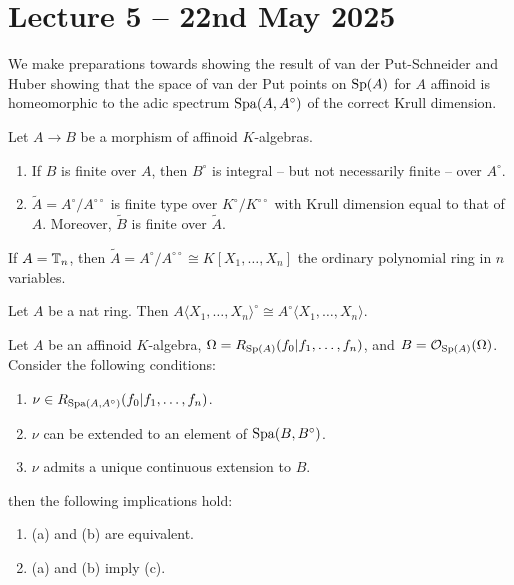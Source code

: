 \section{Lecture 5 -- 22nd May 2025}\label{sec: lecture 5}
We make preparations towards showing the result of van der Put-Schneider and Huber \cite[Thm. 4]{vdPclassification} showing that the space of van der Put points on $\mathrm{Sp}(A)$ for $A$ affinoid is homeomorphic to the adic spectrum $\mathrm{Spa}(A,A^{\circ})$ of the correct Krull dimension. 
\begin{proposition}
    Let $A\to B$ be a morphism of affinoid $K$-algebras. 
    \begin{enumerate}[label=(\roman*)]
        \item If $B$ is finite over $A$, then $B^{\circ}$ is integral -- but not necessarily finite -- over $A^{\circ}$. 
        \item $\widetilde{A}=A^{\circ}/A^{\circ\circ}$ is finite type over $K^{\circ}/K^{\circ\circ}$ with Krull dimension equal to that of $A$. Moreover, $\widetilde{B}$ is finite over $\widetilde{A}$. 
    \end{enumerate}
\end{proposition}
\begin{example}
    If $A=\mathbb{T}_{n}$, then $\widetilde{A}=A^{\circ}/A^{\circ\circ}\cong K[X_{1},\dots,X_{n}]$ the ordinary polynomial ring in $n$ variables. 
\end{example}
\begin{proposition}\label{prop: powerbounded commutes with polynomial algebra}
    Let $A$ be a nat ring. Then $A\langle X_{1},\dots,X_{n}\rangle^{\circ}\cong A^{\circ}\langle X_{1},\dots,X_{n}\rangle$. 
\end{proposition}
\begin{lemma}\label{lem: key lemma vdP points}
    Let $A$ be an affinoid $K$-algebra, $\Omega=R_{\mathrm{Sp}(A)}(f_{0}|f_{1},\dots,f_{n})$, and $B=\mathcal{O}_{\mathrm{Sp}(A)}(\Omega)$. Consider the following conditions:
    \begin{enumerate}[label=(\alph*)]
        \item $\nu\in R_{\mathrm{Spa}(A,A^{\circ})}(f_{0}|f_{1},\dots,f_{n})$. 
        \item $\nu$ can be extended to an element of $\mathrm{Spa}(B,B^{\circ})$. 
        \item $\nu$ admits a unique continuous extension to $B$. 
    \end{enumerate}
    then the following implications hold:
    \begin{enumerate}[label=(\roman*)]
        \item (a) and (b) are equivalent. 
        \item (a) and (b) imply (c). 
    \end{enumerate}
\end{lemma}

